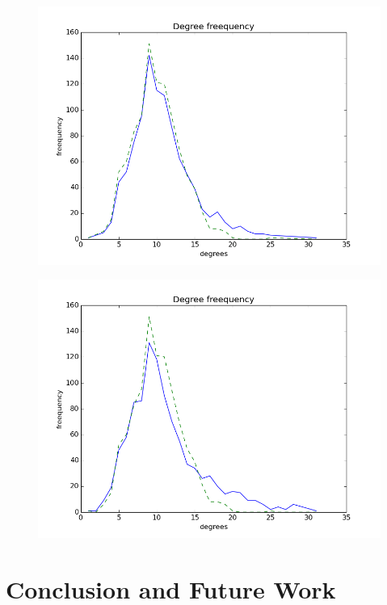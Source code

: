 \documentclass[12pt]{report}
\numberwithin{figure}{section}
\numberwithin{table}{section}
\begin{document}
\begin{figure}[H]
\centering
\includegraphics[scale=0.8]{images/ddas1}

\end{figure}

\begin{figure}[H]
\centering
\includegraphics[scale=0.8]{images/ddas2}

\end{figure}

\chapter{Conclusion and Future Work }
\end{document}
